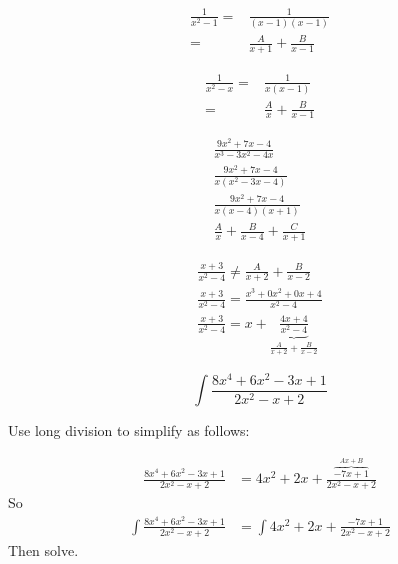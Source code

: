 \begin{ex}
  \begin{align*}
    \frac{1}{x^2-1}
    =&\frac{1}{(x-1)(x-1)} \\
    =&\frac{A}{x+1}+\frac{B}{x-1}
  \end{align*}
\end{ex}
\begin{ex}
  \begin{align*}
    \frac{1}{x^2-x}
     =&\frac{1}{x(x-1)} \\
     =&\frac{A}{x}+\frac{B}{x-1}
  \end{align*}
\end{ex}

\begin{ex}
  \begin{align*}
   \frac {9x^2+7x-4}{x^3-3x^2-4x} \\
   \frac {9x^2+7x-4}{x(x^2-3x-4)} \\
   \frac {9x^2+7x-4}{x(x-4)(x+1)} \\
   \frac{A}{x}+\frac{B}{x-4}+\frac{C}{x+1}
  \end{align*}
\end{ex}
\begin{ex}
  \begin{align*}
   \frac {x+3}{x^2-4} \neq \frac {A}{x+2} + \frac {B}{x-2} \\
   \frac {x+3}{x^2-4} = \frac {x^3+0x^2+0x+4}{x^2-4} \\
   \frac {x+3}{x^2-4} = x + \underbrace{\frac {4x+4}{x^2-4}}_{\frac{A}{x+2}+\frac{B}{x-2}}
 \end{align*}
\end{ex}
\begin{ex}
  \[ \int \frac{8x^4+6x^2-3x+1}{2x^2-x+2} \]
  \begin{sol}
  Use long division to simplify as follows:
    \begin{center}
    \end{center}
    \begin{align*}
      \frac{8x^4+6x^2-3x+1}{2x^2-x+2} &=
      4x^2+2x+\frac{\overbrace{-7x+1}^{Ax+B}}{2x^2-x+2}
    \end{align*}
    So
    \begin{align*}
      \int \frac{8x^4+6x^2-3x+1}{2x^2-x+2}
      &= \int 4x^2+2x+\frac{-7x+1}{2x^2-x+2}
    \end{align*}
    Then solve.
  \end{sol}
\end{ex}

